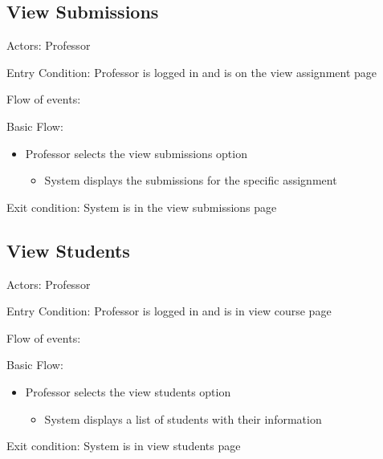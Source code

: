 \subsection*{View Submissions}\label{section:h.sdxmdqspwi1p}
Actors: Professor

Entry Condition: Professor is logged in and is on the view 
assignment page

Flow of events:

Basic Flow:

\begin{itemize}
\item Professor selects the view submissions option
\begin{itemize}
\item System displays the submissions for the specific assignment
\end{itemize}
\end{itemize}
Exit condition: System is in the view submissions page

\subsection*{View Students}\label{section:h.ehmhdybzzy6b}
Actors: Professor

Entry Condition: Professor is logged in and is in view course 
page

Flow of events:

Basic Flow:

\begin{itemize}
\item Professor selects the view students option
\begin{itemize}
\item System displays a list of students with their information
\end{itemize}
\end{itemize}
Exit condition: System is in view students page